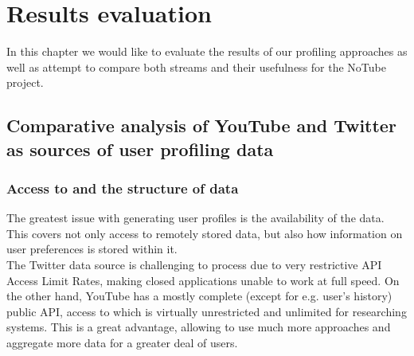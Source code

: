 \section{Results evaluation}

In this chapter we would like to evaluate the results of our profiling approaches as well as attempt to compare both streams and their usefulness for the NoTube project.

\subsection{Comparative analysis of YouTube and Twitter as sources of user
profiling data}

\subsubsection{Access to and the structure of data}
The greatest issue with generating user profiles is the availability of the data. This covers not only access to remotely
stored data, but also how information on user preferences is stored within it.
\\ The Twitter data source is challenging to process due to very restrictive API Access Limit Rates, making closed applications
unable to work at full speed. On the other hand, YouTube has a mostly complete (except for e.g. user's history) public API,
access to which is virtually unrestricted and unlimited for researching systems. This is a great advantage, allowing to use
much more approaches and aggregate more data for a greater deal of users.

